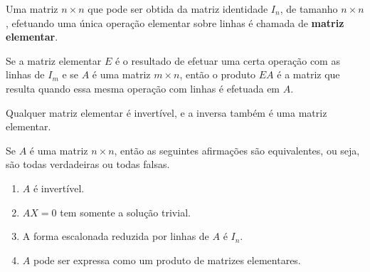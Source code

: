 \begin{definicao}
    Uma matriz $n\times n$ que pode ser obtida da matriz identidade $I_n$, de tamanho $n\times n$, efetuando uma 
    única operação elementar sobre linhas é chamada de \textbf{matriz elementar}.
\end{definicao}

\begin{teorema}
    Se a matriz elementar $E$ é o resultado de efetuar uma certa operação com as linhas de $I_m$ e se $A$ é uma matriz 
    $m \times n$, então o produto $EA$ é a matriz que resulta quando essa mesma operação com linhas é efetuada em $A$.
\end{teorema}

\begin{teorema}
    Qualquer matriz elementar é invertível, e a inversa também é uma matriz elementar.
\end{teorema}

\begin{teorema}
    Se $A$ é uma matriz $n \times n$, então as seguintes afirmações são equivalentes, ou seja, são todas verdadeiras  
    ou todas falsas.
    \begin{enumerate}[label={\roman*})]
        \item $A$ é invertível.
        
        \item $AX = 0$ tem somente a solução trivial.

        \item A forma escalonada reduzida por linhas de $A$ é $I_n$.

        \item $A$ pode ser expressa como um produto de matrizes elementares.
    \end{enumerate}
\end{teorema}
